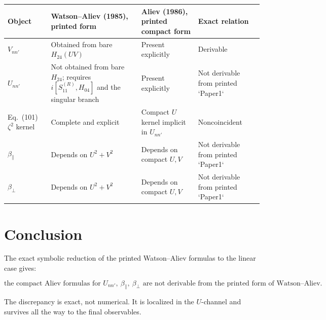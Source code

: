 \documentclass[11pt]{article}
\begin{document}
\begin{center}
\begin{tabular}{>{\raggedright\arraybackslash}p{3.2cm} >{\raggedright\arraybackslash}p{4.7cm} >{\raggedright\arraybackslash}p{4.7cm} >{\raggedright\arraybackslash}p{3.2cm}}
\toprule
Object & Watson--Aliev (1985), printed form & Aliev (1986), printed compact form & Exact relation \\
\midrule
\(V_{nn'}\) & Obtained from bare \(H_{24}(UV)\) & Present explicitly & Derivable \\
\(U_{nn'}\) & Not obtained from bare \(H_{24}\); requires \(i[S_{11}^{(R)},H_{04}]\) and the singular branch & Present explicitly & Not derivable from printed `Paper1` \\
Eq.~(101) \(\zeta^2\) kernel & Complete and explicit & Compact \(U\) kernel implicit in \(U_{nn'}\) & Noncoincident \\
\(\beta_{\parallel}\) & Depends on \(U^2+V^2\) & Depends on compact \(U,V\) & Not derivable from printed `Paper1` \\
\(\beta_{\perp}\) & Depends on \(U^2+V^2\) & Depends on compact \(U,V\) & Not derivable from printed `Paper1` \\
\bottomrule
\end{tabular}
\end{center}

\section*{Conclusion}

The exact symbolic reduction of the printed Watson--Aliev formulas to the linear case gives:

\[
\boxed{
\text{the compact Aliev formulas for }U_{nn'},\ \beta_{\parallel},\ \beta_{\perp}
\text{ are not derivable from the printed form of Watson--Aliev.}
}
\]

The discrepancy is exact, not numerical. It is localized in the \(U\)-channel and survives all the way to the final observables.
\end{document}
